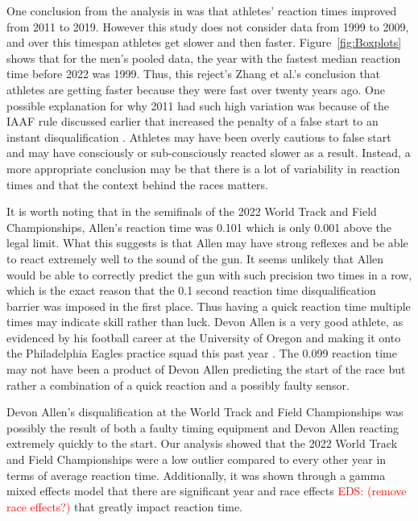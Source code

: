 \documentclass[12pt, letterpaper, titlepage]{article}
\newcommand{\eds}[1]{\textcolor{red}{EDS: (#1)}}
\begin{document}
One conclusion from the analysis in \citet{zhang2021correlation} was that 
athletes'
reaction times improved from 2011 to 2019.  However this study does not consider 
data from 1999 to 2009, and over this timespan athletes get slower and then
faster.  Figure~\ref{fig:Boxplots} shows that for the men's pooled data, the 
year with the fastest median reaction time before 2022 was 1999.  Thus, this 
reject's Zhang et al.'s conclusion that athletes are getting faster because they 
were 
fast over twenty years ago. One possible explanation for why 2011 had such
high variation was because of the IAAF rule discussed earlier that increased the
penalty of a false start to an instant disqualification \citep{iaaf2009falsestart}.
Athletes may have been overly cautious to false start and may have consciously
or sub-consciously reacted slower as a result.  Instead, a more appropriate 
conclusion may be that there is a lot of variability in reaction times and that
the context behind the races matters.

It is worth noting that in the semifinals of the 2022 World Track and
Field Championships, Allen's reaction time was 0.101 which is only 0.001 above
the legal limit. What this suggests is that Allen may have strong reflexes
and be able to react extremely well to the sound of the gun. It seems unlikely 
that Allen would be able to correctly predict the gun with such precision two 
times in a row, which is the exact reason that the 0.1 second reaction time 
disqualification barrier was
imposed in the first place. Thus having a quick reaction time multiple times
may indicate skill rather than luck. Devon 
Allen is a very good athlete, as evidenced by his football career at the 
University of Oregon
and making it onto the Philadelphia Eagles practice squad this past year 
\citep{hurley2022eagles}. The 0.099 reaction time may not have been 
a product of Devon Allen predicting the start of the race but rather a 
combination of a quick reaction and a possibly faulty sensor.

Devon Allen's disqualification at the World Track and Field Championships was
possibly the result of both a faulty timing equipment and Devon Allen
reacting extremely quickly to the start.  Our analysis showed that
the 2022 World Track and Field Championships were a low outlier compared to
every other year in terms of average reaction time.  Additionally, it was shown
through a gamma mixed effects model that there are significant year and race
effects \eds{remove race effects?} that greatly impact reaction time.  
\end{document}
